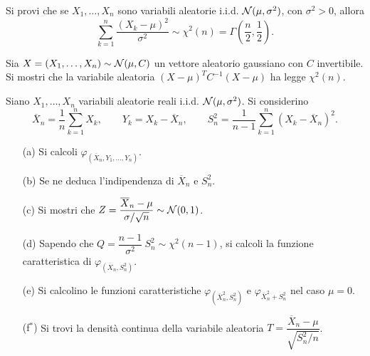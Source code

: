 \Esercizio{} %
Si provi che se $X_1,\dots,X_n$ sono variabili aleatorie i.i.d. $\mathcal{N}(\mu,\sigma^2)$, con $\sigma^2>0$, allora 
\[
\sum_{k=1}^{n}\frac{(X_k-\mu)^2}{\sigma^2}\sim\chi^2(n)=\Gamma\left(\frac{n}{2},\frac{1}{2}  \right).
\]

\Esercizio{} %
Sia $X=(X_1,\dots,X_n)\sim\mathcal{N}(\mu,C)$ un vettore aleatorio gaussiano con $C$ invertibile. Si mostri che la variabile aleatoria $(X-\mu)^TC^{-1}(X-\mu)$ ha legge $\chi^2(n)$.

\Esercizio{} %
Siano $X_1,\dots,X_n$ variabili aleatorie reali i.i.d. $\mathcal{N}(\mu,\sigma^2)$.  Si considerino
\[
\overline{X}_n=\frac{1}{n}\sum_{k=1}^nX_k,\qquad Y_k=X_k-\overline{X}_n,\qquad S_n^2=\frac{1}{n-1}\sum_{k=1}^n(X_k-\overline{X}_n)^2.
\]
\begin{enumerate}
\item [(a)] Si calcoli $\varphi_{(\overline{X}_n,Y_1,\dots,Y_n)}$.
\item [(b)] Se ne deduca l'indipendenza di $\overline{X}_n$ e $S_n^2$.
\item [(c)] Si mostri che $Z=\dfrac{\overline{X}_n-\mu}{\sigma/\sqrt{n}}\sim\mathcal{N}(0,1)$.
\item [(d)] Sapendo che $Q=\dfrac{n-1}{\sigma^2}\ S_n^2\sim\chi^2(n-1)$, si calcoli la funzione caratteristica di $\varphi_{(\overline{X}_n,S_n^2)}$.
\item [(e)] Si calcolino le funzioni caratteristiche $\varphi_{(\overline{X}_n^2,S_n^2)}$ e $\varphi_{\overline{X}_n^2+S_n^2}$ nel caso $\mu=0$.
\item [(f$^*$)] Si trovi la densità continua della variabile aleatoria $T=\dfrac{\overline{X}_n-\mu}{\sqrt{S_n^2/n}}$.
\end{enumerate}

\ParteSoluzioni

